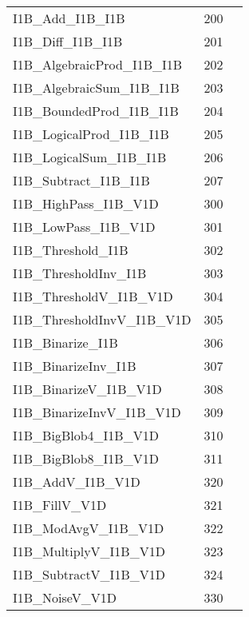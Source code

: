 \documentclass[11pt]{jsbook} %
\begin{document}
\begin{tabular}{l|r|l}
  I1B\_Add\_I1B\_I1B                & 200 &  \\
  I1B\_Diff\_I1B\_I1B               & 201 &  \\
  I1B\_AlgebraicProd\_I1B\_I1B      & 202 &  \\
  I1B\_AlgebraicSum\_I1B\_I1B       & 203 &  \\
  I1B\_BoundedProd\_I1B\_I1B        & 204 &  \\
  I1B\_LogicalProd\_I1B\_I1B        & 205 &  \\
  I1B\_LogicalSum\_I1B\_I1B         & 206 &  \\
  I1B\_Subtract\_I1B\_I1B           & 207 &  \\
                           
  I1B\_HighPass\_I1B\_V1D           & 300 &  \\
  I1B\_LowPass\_I1B\_V1D            & 301 &  \\
                           
  I1B\_Threshold\_I1B              & 302 &  \\
  I1B\_ThresholdInv\_I1B           & 303 &  \\
  I1B\_ThresholdV\_I1B\_V1D         & 304 &  \\
  I1B\_ThresholdInvV\_I1B\_V1D      & 305 &  \\
  I1B\_Binarize\_I1B               & 306 &  \\
  I1B\_BinarizeInv\_I1B            & 307 &  \\
  I1B\_BinarizeV\_I1B\_V1D          & 308 &  \\
  I1B\_BinarizeInvV\_I1B\_V1D       & 309 &  \\
                           
  I1B\_BigBlob4\_I1B\_V1D           & 310 &  \\
  I1B\_BigBlob8\_I1B\_V1D           & 311 &  \\
                            
  I1B\_AddV\_I1B\_V1D               & 320 &  \\
  I1B\_FillV\_V1D                  & 321 &  \\
  I1B\_ModAvgV\_I1B\_V1D            & 322 &  \\
  I1B\_MultiplyV\_I1B\_V1D          & 323 &  \\
  I1B\_SubtractV\_I1B\_V1D          & 324 &  \\
                           
  I1B\_NoiseV\_V1D                 & 330 &  \\
                           

\end{tabular}
\end{document}
